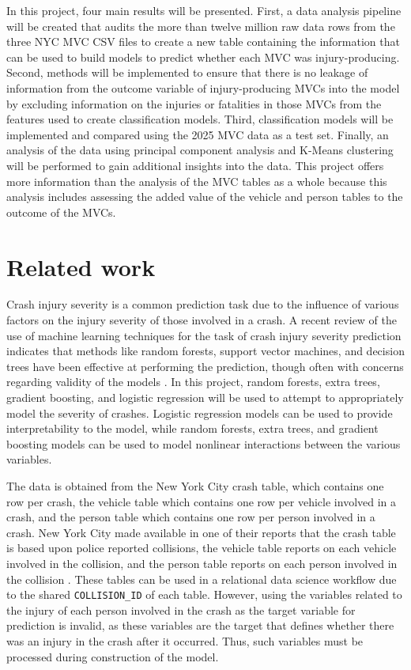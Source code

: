\documentclass{article}
\begin{document}
In this project, four main results will be presented. First, a data analysis pipeline will be created that audits the more than twelve million raw data rows from the three NYC MVC CSV files to create a new table containing the information that can be used to build models to predict whether each MVC was injury-producing. Second, methods will be implemented to ensure that there is no leakage of information from the outcome variable of injury-producing MVCs into the model by excluding information on the injuries or fatalities in those MVCs from the features used to create classification models. Third, classification models will be implemented and compared using the 2025 MVC data as a test set. Finally, an analysis of the data using principal component analysis and K-Means clustering will be performed to gain additional insights into the data. This project offers more information than the analysis of the MVC tables as a whole because this analysis includes assessing the added value of the vehicle and person tables to the outcome of the MVCs.

\section{Related work}

Crash injury severity is a common prediction task due to the influence of various factors on the injury severity of those involved in a crash. A recent review of the use of machine learning techniques for the task of crash injury severity prediction indicates that methods like random forests, support vector machines, and decision trees have been effective at performing the prediction, though often with concerns regarding validity of the models \citep{santos2022review}. In this project, random forests, extra trees, gradient boosting, and logistic regression will be used to attempt to appropriately model the severity of crashes. Logistic regression models can be used to provide interpretability to the model, while random forests, extra trees, and gradient boosting models can be used to model nonlinear interactions between the various variables.

The data is obtained from the New York City crash table, which contains one row per crash, the vehicle table which contains one row per vehicle involved in a crash, and the person table which contains one row per person involved in a crash. New York City made available in one of their reports that the crash table is based upon police reported collisions, the vehicle table reports on each vehicle involved in the collision, and the person table reports on each person involved in the collision \citep{nyc_crashes,nyc_vehicles,nyc_person}. These tables can be used in a relational data science workflow due to the shared \texttt{COLLISION\_ID} of each table. However, using the variables related to the injury of each person involved in the crash as the target variable for prediction is invalid, as these variables are the target that defines whether there was an injury in the crash after it occurred. Thus, such variables must be processed during construction of the model.
\end{document}
